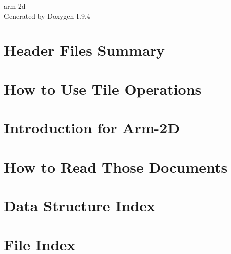 \documentclass[twoside]{book}
\newcommand{\+}{\discretionary{\mbox{\scriptsize$\hookleftarrow$}}{}{}}
\newcommand{\clearemptydoublepage}{%
    \newpage{\pagestyle{empty}\cleardoublepage}%
  }
\begin{document}
  \raggedbottom
    \hypersetup{pageanchor=false,
                bookmarksnumbered=true,
                pdfencoding=unicode
               }
  \begin{titlepage}
  \vspace*{7cm}
  \begin{center}%
  {\Large arm-\/2d}\\
  \vspace*{1cm}
  {\large Generated by Doxygen 1.9.4}\\
  \end{center}
  \end{titlepage}
  \clearemptydoublepage
  \tableofcontents
  \clearemptydoublepage
  \hypersetup{pageanchor=true}
\chapter{Header Files Summary}
\label{md__Users_gabwan01_Documents_Work_CPMK_Git_EndpointAI_Kernels_Research_Arm_2D_Library_Include_README}

\chapter{How to Use Tile Operations}
\label{md_how_to_use_tile_operations}

\chapter{Introduction for Arm-\/2D}
\label{md_Introduction}

\chapter{How to Read Those Documents}
\label{md_README}

\chapter{Data Structure Index}

\chapter{File Index}

\end{document}
